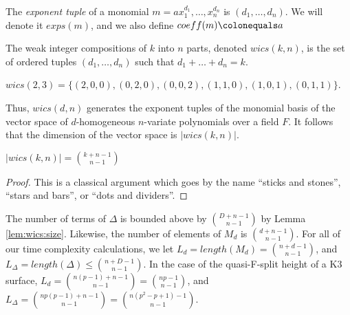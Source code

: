 \begin{defn}
    The \textit{exponent tuple} of a monomial 
    $m = ax_{1}^{d_1}, \dots, x_{n}^{d_n}$ is $(d_1, \dots, d_n)$. 
	We will denote it $exps(m)$, and we also 
    define $coeff(m) \colonequals a$
\end{defn}

\begin{defn}
    The weak integer compositions of $k$ into $n$ parts, 
    denoted $wics(k, n)$, is the set of ordered tuples 
	\((d_{1}, \ldots, d_{n})\) such that 
    \(d_{1} + \ldots + d_{n} = k\).
\end{defn}

\begin{ex}
    $wics(2, 3) = \lbrace (2, 0, 0), (0, 2, 0), (0, 0, 2), (1, 1, 0), (1, 0, 1), (0, 1, 1) \rbrace$.
\end{ex}

Thus, $wics(d, n)$ generates the exponent tuples of the 
monomial basis of the vector space of $d$-homogeneous 
$n$-variate polynomials over a field $F$.
It follows that the dimension of the vector space is $|wics(k, n)|$.

\begin{lem}
    \label{lem:wics:size}
    $|wics(k, n)| = \binom{k + n - 1}{n - 1}$
\end{lem}

\begin{proof}
	This is a classical argument which goes by the 
    name ``sticks and stones'', ``stars and bars'', or 
    ``dots and dividers''.
\end{proof}


\begin{rmk}
    The number of terms of \(\Delta\) is bounded 
    above by \(\binom{D+n-1}{n-1}\) by Lemma \ref{lem:wics:size}.
    Likewise, the number of elements of 
    \(M_{d}\) is \(\binom{d+n-1}{n-1}\).
    For all of our time complexity calculations, 
    we let $L_{d} = length(M_{d}) = \binom{n + d - 1}{n - 1}$, 
    and $L_{\Delta} = length(\Delta) \leq \binom{n + D - 1}{n - 1}$.
    In the case of the quasi-F-split height of a K3 surface, 
    $L_{d} = \binom{n(p - 1) + n - 1}{n - 1} = \binom{np - 1}{n - 1}$, 
    and $L_{\Delta} = \binom{np(p - 1) + n - 1}{n - 1} = \binom{n(p^2 - p + 1) - 1}{n - 1}$.
\end{rmk}

